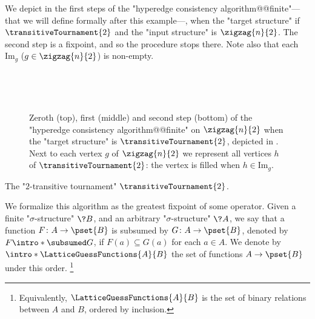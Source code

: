 \begin{example}
	\AP\label{ex:zigzag-HC-T2}
	We depict in  the first steps of the "hyperedge consistency algorithm@@finite"---that we will define formally after this example---, when the "target structure"
	if $\transitiveTournament{2}$ and the "input structure" is $\zigzag{n}{2}$.
	The second step is a fixpoint, and so the procedure stops there. Note also that
	each $\textrm{Im}_g$ ($g\in \zigzag{n}{2}$) is non-empty. 
\end{example}

\begin{figure}
	\centering
	\begin{tikzpicture}
		
		
	\end{tikzpicture}\\[2em]
	\begin{tikzpicture}
		
		
	\end{tikzpicture}\\[2em]
	\begin{tikzpicture}
		
		
	\end{tikzpicture}
	\caption{\AP\label{fig:zigzag-graph-HC-T2} Zeroth (top), first (middle) and second step (bottom) of the "hyperedge consistency algorithm@@finite" on $\zigzag{n}{2}$
	when the "target structure" is $\transitiveTournament{2}$, depicted in . Next to each vertex $g$ of $\zigzag{n}{2}$ we represent
	all vertices $h$ of $\transitiveTournament{2}$: the vertex is filled
	when $h \in \textrm{Im}_{g}$.
	}
\end{figure}
\begin{marginfigure}[-15.5em]
	\centering
	\begin{tikzpicture}
		
	\end{tikzpicture}
	\caption{
		\AP\label{fig:zigzag-graph-HC-T2-side-T2}
		The "$2$-transitive tournament" $\transitiveTournament{2}$.
	}
\end{marginfigure}

We formalize this algorithm as the greatest fixpoint of some operator.
Given a finite "$\sigma$-structure" $\?B$, and an arbitrary%
"$\sigma$-structure" $\?A$, we say that a function $F\colon A \to \pset{B}$ is subsumed
by $G\colon A \to \pset{B}$, denoted by \AP\(F \intro*\subsumed G\),
if $F(a) \subseteq G(a)$ for each $a \in A$. We denote by
\AP\(\intro*\LatticeGuessFunctions{A}{B}\) the set of functions $A \to \pset{B}$ under this order.%
\footnote{Equivalently, $\LatticeGuessFunctions{A}{B}$ is the
set of binary relations between $A$ and $B$, ordered by inclusion.}

